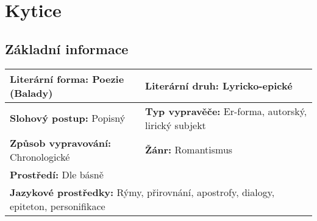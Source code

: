 \section{Kytice}
\label{sec:kytice}
\subsection*{Základní informace}
\begin{tabularx}{\linewidth}{l|l}
  \textbf{Literární forma:} Poezie (Balady\footnotemark[1]) & \textbf{Literární druh:} Lyricko-epické                     \\
  \hline
  \textbf{Slohový postup:} Popisný                          & \textbf{Typ vypravěče:} Er-forma, autorský, lirický subjekt \\
  \hline
  \textbf{Způsob vypravování:} Chronologické                & \textbf{Žánr:} Romantismus                                  \\
  \hline
  \multicolumn{2}{l}{\textbf{Prostředí:} Dle básně}                                                                       \\
  \hline
  \multicolumn{2}{l}{\textbf{Jazykové prostředky:} Rýmy, přirovnání, apostrofy, dialogy, epiteton, personifikace}         \\
\end{tabularx}
